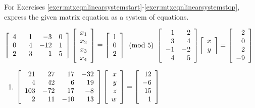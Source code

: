\noindent For Exercises \ref{exer:mtxeqnlinearsystemstart}-\ref{exer:mtxeqnlinearsystemstop}, express the given matrix equation as a system of equations.
\begin{enumerate}[!HW!, resume, label=$\spadesuit$ \arabic*., ref=\arabic*]
\begin{multicols}{2}
\item\label{exer:mtxeqnlinearsystemstart} \mbox{$\mtx{rrrr}{4&1&-3 &0\\ 0 &4&-12 &1 \\ 2&-3&-1&5}\vr{x_1\\x_2\\x_3\\x_4} \equiv \vr{1\\0\\2} \pmod 5$}
\itemspade $\mtx{rr}{1 & 2 \\ 3 & 4\\ -1 & -2 \\ 4&5}\vr{x\\y} = \vr{2\\0\\2\\-9}$
\end{multicols}
\end{enumerate}
\begin{enumerate}[!HW!]
\item\label{exer:mtxeqnlinearsystemstop} $\mtx{rrrr}{21&27&17&-32\\4&42&6&19\\103&-72&17&-8\\2&11&-10&13}\vr{x\\y\\z\\w}=\vr{12\\-6\\15\\1}$ %
\end{enumerate}

